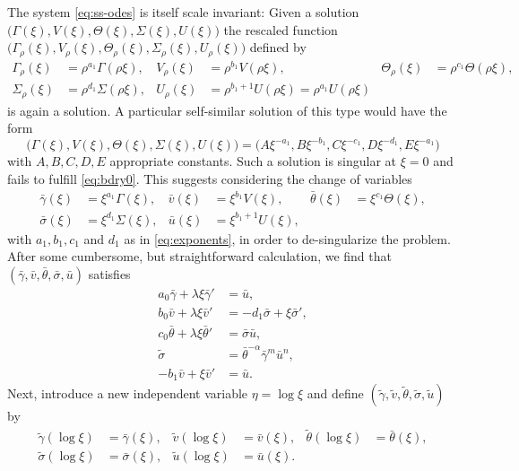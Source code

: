 \documentclass[a4paper,11pt]{article}
\def\blue{\color{blue}}
\def\bg{{\bar{\gamma}}}
\def\bv{{\bar{v}}}
\def\bth{{\bar{\theta}}}
\def\bs{{\bar{\sigma}}}
\def\bu{{\bar{u}}}
\def\tg{{\tilde{\gamma}}}
\def\tv{{\tilde{v}}}
\def\tth{{\tilde{\theta}}}
\def\ts{{\tilde{\sigma}}}
\def\tu{{\tilde{u}}}
\theoremstyle{remark}
\begin{document}
The system \eqref{eq:ss-odes} is itself scale invariant: Given a solution $\big(\Gamma(\xi), V(\xi), \Theta(\xi), \Sigma(\xi), U(\xi)\big)$ the rescaled
function $\big(\Gamma_\rho(\xi), V_\rho(\xi), \Theta_\rho(\xi), \Sigma_\rho(\xi), U_\rho(\xi)\big)$ defined by
\begin{equation}
\label{selfsimilardef2}
\begin{aligned}
 \Gamma_\rho(\xi)&=\rho^{a_1}\Gamma(\rho\xi), & V_\rho(\xi)&=\rho^{b_1}V(\rho\xi), & \Theta_\rho(\xi)&=\rho^{c_1}\Theta(\rho\xi),\\
 \Sigma_\rho(\xi)&=\rho^{d_1}\Sigma(\rho\xi), & U_\rho(\xi)&=\rho^{b_1+1}U(\rho\xi)=\rho^{a_1}U(\rho\xi)
\end{aligned}
\end{equation}
is again a solution. 
{\blue A particular self-similar solution of this type would have the form}
 $$\big(\Gamma(\xi), V(\xi), \Theta(\xi), \Sigma(\xi), U(\xi)\big)=\big(A\xi^{-a_1}, B\xi^{-b_1},C\xi^{-c_1},D\xi^{-d_1},E\xi^{-a_1}\big)$$ 
with $A, B, C, D, E$ appropriate constants. Such a solution is singular at $\xi =0$ and fails {\blue to fulfill \eqref{eq:bdry0}. This suggests considering} the change of variables
\begin{equation} \label{eq:CAPtoBAR}
\begin{aligned}
 \bg(\xi)&=\xi^{a_1}\Gamma(\xi), &
 \bv(\xi)&=\xi^{b_1}V(\xi), &
 \bth(\xi)&=\xi^{c_1}\Theta(\xi), \\
 \bs(\xi)&=\xi^{d_1}\Sigma(\xi), &
 \bu(\xi)&=\xi^{b_1+1}U(\xi) ,
\end{aligned}
\end{equation}
with $a_1, b_1, c_1$ and $d_1$ as in \eqref{eq:exponents}, in order to de-singularize the problem.
After some cumbersome, but straightforward calculation, we find that $(\bg,\bv,\bth,\bs,\bu)$ satisfies
\begin{equation} \label{eq:barsys}
 \begin{aligned}
  a_0\bg + \lambda\xi\bg' &=\bu,\\
  b_0\bv + \lambda\xi\bv' &=-d_1 \bs + \xi\bs',\\
  c_0\bth+ \lambda\xi\bth'&=\bs\bu,\\
  \ts &=\bth^{-\alpha}\bg^m\bu^n,\\
  -b_1\bv+\xi\bv' &= \bu.
 \end{aligned}
\end{equation}
Next, introduce a new independent variable $\eta = \log\xi$ and define $(\tg,\tv,\tth,\ts,\tu)$ by
\begin{equation} \label{eq:BARtoTIL}
\begin{aligned}
 \tg(\log\xi)&=\bg(\xi), &
 \tv(\log\xi)&=\bv(\xi), &
 \tth(\log\xi)&=\bth(\xi), \\
 \ts(\log\xi)&=\bs(\xi), &
 \tu(\log\xi)&=\bu(\xi).
\end{aligned}
\end{equation}
\end{document}
